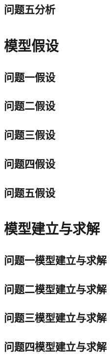 \documentclass{article}
\begin{document}
\subsection{问题五分析}

\section{模型假设}

\subsection{问题一假设}

\subsection{问题二假设}

\subsection{问题三假设}

\subsection{问题四假设}

\subsection{问题五假设}

\section{模型建立与求解}

\subsection{问题一模型建立与求解}

\subsection{问题二模型建立与求解}

\subsection{问题三模型建立与求解}

\subsection{问题四模型建立与求解}
\end{document}
